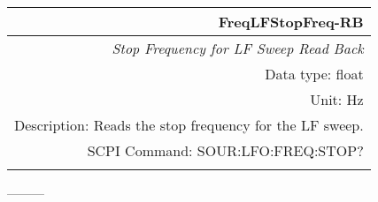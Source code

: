 \documentclass[openany]{article}
\begin{document}
		\begin{tabular}{N}
			\hline
			\bfseries FreqLFStopFreq-RB \\ \hline
			\emph{Stop Frequency for LF Sweep Read Back} \\
			Data type: float \\
			Unit: Hz \\
			Description: Reads the stop frequency for the LF sweep. \\
			SCPI Command: SOUR:LFO:FREQ:STOP? \\
			\\

		\end{tabular}



---------
\end{document}
